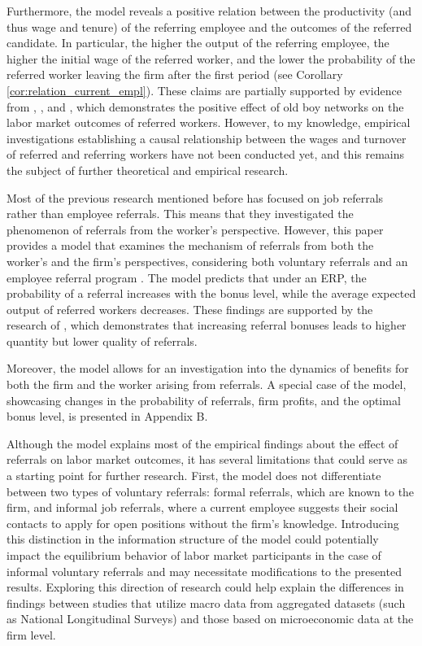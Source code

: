 \documentclass[12pt]{article}
\begin{document}
Furthermore, the model reveals a positive relation between the productivity (and thus wage and tenure) of the referring employee and the outcomes of the referred candidate. In particular, the higher the output of the referring employee, the higher the initial wage of the referred worker, and the lower the probability of the referred worker leaving the firm after the first period (see Corollary \ref{cor:relation_current_empl}). These claims are partially supported by evidence from \cite{simon1992matchmaker}, \cite{kugler2003employee}, and \cite{pallais2016referential}, which demonstrates the positive effect of old boy networks on the labor market outcomes of referred workers. However, to my knowledge, empirical investigations establishing a causal relationship between the wages and turnover of referred and referring workers have not been conducted yet, and this remains the subject of further theoretical and empirical research.

Most of the previous research mentioned before has focused on job referrals rather than employee referrals. This means that they investigated the phenomenon of referrals from the worker's perspective. However, this paper provides a model that examines the mechanism of referrals from both the worker's and the firm's perspectives, considering both voluntary referrals and an employee referral program . The model predicts that under an ERP, the probability of a referral increases with the bonus level, while the average expected output of referred workers decreases. These findings are supported by the research of \cite{friebel2023employee}, which demonstrates that increasing referral bonuses leads to higher quantity but lower quality of referrals.

Moreover, the model allows for an investigation into the dynamics of benefits for both the firm and the worker arising from referrals. A special case of the model, showcasing changes in the probability of referrals, firm profits, and the optimal bonus level, is presented in Appendix B.

Although the model explains most of the empirical findings about the effect of referrals on labor market outcomes, it has several limitations that could serve as a starting point for further research. First, the model does not differentiate between two types of voluntary referrals: formal referrals, which are known to the firm, and informal job referrals, where a current employee suggests their social contacts to apply for open positions without the firm's knowledge. Introducing this distinction in the information structure of the model could potentially impact the equilibrium behavior of labor market participants in the case of informal voluntary referrals and may necessitate modifications to the presented results. Exploring this direction of research could help explain the differences in findings between studies that utilize macro data from aggregated datasets (such as National Longitudinal Surveys) and those based on microeconomic data at the firm level. 
\end{document}
